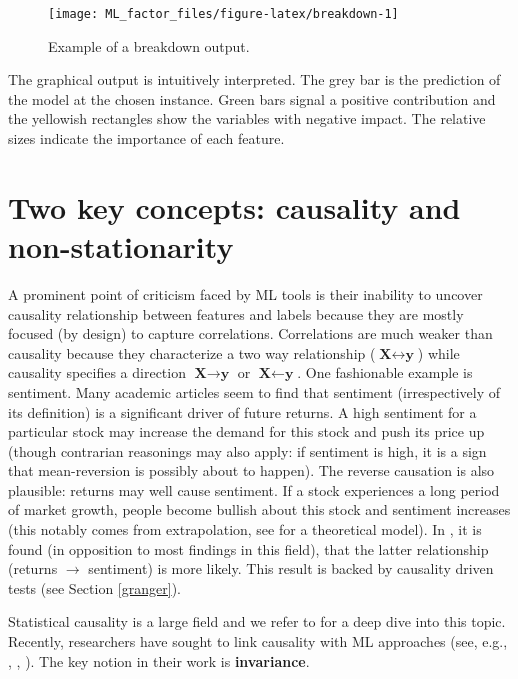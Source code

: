 \documentclass[]{krantz}
\theoremstyle{definition}
\theoremstyle{definition}
\theoremstyle{definition}
\theoremstyle{remark}
\begin{document}
\begin{figure}[b]
\texttt{[image: ML\_factor\_files/figure-latex/breakdown-1]} \caption{Example of a breakdown output.}\label{fig:breakdown}
\end{figure}

\normalsize

The graphical output is intuitively interpreted. The grey bar is the
prediction of the model at the chosen instance. Green bars signal a
positive contribution and the yellowish rectangles show the variables
with negative impact. The relative sizes indicate the importance of each
feature.

\hypertarget{causality}{%
\chapter{Two key concepts: causality and
non-stationarity}\label{causality}}

A prominent point of criticism faced by ML tools is their inability to
uncover causality relationship between features and labels because they
are mostly focused (by design) to capture correlations. Correlations are
much weaker than causality because they characterize a two way
relationship (\(\textbf{X}\leftrightarrow \textbf{y}\)) while causality
specifies a direction \(\textbf{X}\rightarrow \textbf{y}\) or
\(\textbf{X}\leftarrow \textbf{y}\). One fashionable example is
sentiment. Many academic articles seem to find that sentiment
(irrespectively of its definition) is a significant driver of future
returns. A high sentiment for a particular stock may increase the demand
for this stock and push its price up (though contrarian reasonings may
also apply: if sentiment is high, it is a sign that mean-reversion is
possibly about to happen). The reverse causation is also plausible:
returns may well cause sentiment. If a stock experiences a long period
of market growth, people become bullish about this stock and sentiment
increases (this notably comes from extrapolation, see
\citet{barberis2015x} for a theoretical model). In
\citet{coqueret2018economic}, it is found (in opposition to most
findings in this field), that the latter relationship (returns
\(\rightarrow\) sentiment) is more likely. This result is backed by
causality driven tests (see Section \ref{granger}).

Statistical causality is a large field and we refer to
\citet{pearl2009causality} for a deep dive into this topic. Recently,
researchers have sought to link causality with ML approaches (see, e.g.,
\citet{peters2017elements}, \citet{heinze2018invariant},
\citet{arjovsky2019invariant}). The key notion in their work is
\textbf{invariance}.
\end{document}
